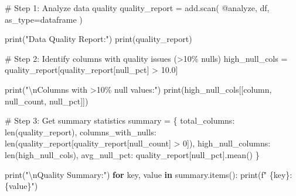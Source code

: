 \documentclass[
  letterpaper,
]{scrbook}
\newenvironment{Shaded}{\begin{snugshade}}{\end{snugshade}}
\newcommand{\BuiltInTok}[1]{\textcolor[rgb]{0.00,0.23,0.31}{#1}}
\newcommand{\CharTok}[1]{\textcolor[rgb]{0.13,0.47,0.30}{#1}}
\newcommand{\CommentTok}[1]{\textcolor[rgb]{0.37,0.37,0.37}{#1}}
\newcommand{\ControlFlowTok}[1]{\textcolor[rgb]{0.00,0.23,0.31}{\textbf{#1}}}
\newcommand{\DecValTok}[1]{\textcolor[rgb]{0.68,0.00,0.00}{#1}}
\newcommand{\FloatTok}[1]{\textcolor[rgb]{0.68,0.00,0.00}{#1}}
\newcommand{\KeywordTok}[1]{\textcolor[rgb]{0.00,0.23,0.31}{\textbf{#1}}}
\newcommand{\NormalTok}[1]{\textcolor[rgb]{0.00,0.23,0.31}{#1}}
\newcommand{\OperatorTok}[1]{\textcolor[rgb]{0.37,0.37,0.37}{#1}}
\newcommand{\SpecialCharTok}[1]{\textcolor[rgb]{0.37,0.37,0.37}{#1}}
\newcommand{\SpecialStringTok}[1]{\textcolor[rgb]{0.13,0.47,0.30}{#1}}
\newcommand{\StringTok}[1]{\textcolor[rgb]{0.13,0.47,0.30}{#1}}
\begin{document}
\begin{Shaded}
\begin{Highlighting}[]
\CommentTok{\# Step 1: Analyze data quality}
\NormalTok{quality\_report }\OperatorTok{=}\NormalTok{ add.scan(}
    \StringTok{\textquotesingle{}@analyze\textquotesingle{}}\NormalTok{,}
\NormalTok{    df,}
\NormalTok{    as\_type}\OperatorTok{=}\StringTok{\textquotesingle{}dataframe\textquotesingle{}}
\NormalTok{)}

\BuiltInTok{print}\NormalTok{(}\StringTok{"Data Quality Report:"}\NormalTok{)}
\BuiltInTok{print}\NormalTok{(quality\_report)}

\CommentTok{\# Step 2: Identify columns with quality issues (\textgreater{}10\% nulls)}
\NormalTok{high\_null\_cols }\OperatorTok{=}\NormalTok{ quality\_report[quality\_report[}\StringTok{\textquotesingle{}null\_pct\textquotesingle{}}\NormalTok{] }\OperatorTok{\textgreater{}} \FloatTok{10.0}\NormalTok{]}

\BuiltInTok{print}\NormalTok{(}\StringTok{"}\CharTok{\textbackslash{}n}\StringTok{Columns with \textgreater{}10\% null values:"}\NormalTok{)}
\BuiltInTok{print}\NormalTok{(high\_null\_cols[[}\StringTok{\textquotesingle{}column\textquotesingle{}}\NormalTok{, }\StringTok{\textquotesingle{}null\_count\textquotesingle{}}\NormalTok{, }\StringTok{\textquotesingle{}null\_pct\textquotesingle{}}\NormalTok{]])}

\CommentTok{\# Step 3: Get summary statistics}
\NormalTok{summary }\OperatorTok{=}\NormalTok{ \{}
    \StringTok{\textquotesingle{}total\_columns\textquotesingle{}}\NormalTok{: }\BuiltInTok{len}\NormalTok{(quality\_report),}
    \StringTok{\textquotesingle{}columns\_with\_nulls\textquotesingle{}}\NormalTok{: }\BuiltInTok{len}\NormalTok{(quality\_report[quality\_report[}\StringTok{\textquotesingle{}null\_count\textquotesingle{}}\NormalTok{] }\OperatorTok{\textgreater{}} \DecValTok{0}\NormalTok{]),}
    \StringTok{\textquotesingle{}high\_null\_columns\textquotesingle{}}\NormalTok{: }\BuiltInTok{len}\NormalTok{(high\_null\_cols),}
    \StringTok{\textquotesingle{}avg\_null\_pct\textquotesingle{}}\NormalTok{: quality\_report[}\StringTok{\textquotesingle{}null\_pct\textquotesingle{}}\NormalTok{].mean()}
\NormalTok{\}}

\BuiltInTok{print}\NormalTok{(}\StringTok{"}\CharTok{\textbackslash{}n}\StringTok{Quality Summary:"}\NormalTok{)}
\ControlFlowTok{for}\NormalTok{ key, value }\KeywordTok{in}\NormalTok{ summary.items():}
    \BuiltInTok{print}\NormalTok{(}\SpecialStringTok{f"  }\SpecialCharTok{\{}\NormalTok{key}\SpecialCharTok{\}}\SpecialStringTok{: }\SpecialCharTok{\{}\NormalTok{value}\SpecialCharTok{\}}\SpecialStringTok{"}\NormalTok{)}
\end{Highlighting}
\end{Shaded}
\end{document}
